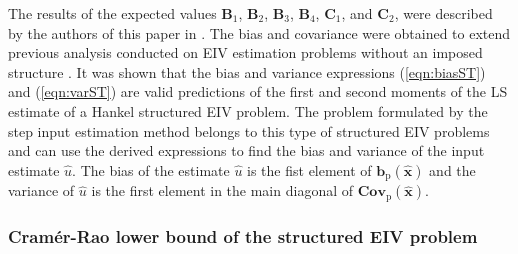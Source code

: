   The results of the expected values $\mathbf{B}_1$, $\mathbf{B}_2$, $\mathbf{B}_3$, $\mathbf{B}_4$, $\mathbf{C}_1$, and $\mathbf{C}_2$, were described by the authors of this paper in \cite{Quintana19}.
The bias and covariance were obtained to extend previous analysis conducted on EIV estimation problems without an imposed structure \cite{Vaccaro94, Stewart90SPT}.
It was shown that the bias and variance expressions (\ref{eqn:biasST}) and (\ref{eqn:varST}) are valid predictions of the first and second moments of the LS estimate of a Hankel structured EIV problem.
The problem formulated by the step input estimation method belongs to this type of structured EIV problems and can use the derived expressions to find the bias and variance of the input estimate $\widehat{u}$.
The bias of the estimate $\widehat{u}$ is the fist element of $\mathbf{b}_{\mathrm{p}} \left( \widehat{\mathbf{x}} \right)$ and the variance of $\widehat{u}$ is the first element in the main diagonal of $\mathrm{\mathbf{Cov}}_{\mathrm{p}} \left( \widehat{\mathbf{x}} \right)$.


\subsubsection{Cram\'er-Rao lower bound of the structured EIV problem}

